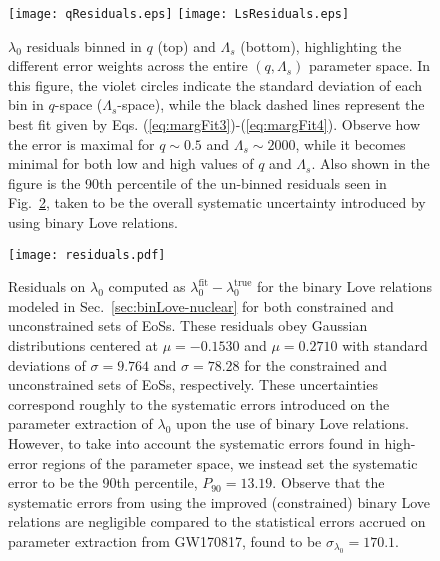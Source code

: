 \documentclass[prd,twocolumn,nofootinbib,superscriptaddress,amsmath,amssymb]{revtex4-1}
\begin{document}
\begin{figure}
\begin{center} 
\texttt{[image: qResiduals.eps]}
\texttt{[image: LsResiduals.eps]}
\end{center}
\caption{$\lambda_0$ residuals binned in $q$ (top) and $\Lambda_s$ (bottom), highlighting the different error weights across the entire $(q,\Lambda_s)$ parameter space.
In this figure, the violet circles indicate the standard deviation of each bin in $q$-space ($\Lambda_s$-space), while the black dashed lines represent the best fit given by Eqs. (\ref{eq:margFit3})-(\ref{eq:margFit4}).
Observe how the error is maximal for $q\sim0.5$ and $\Lambda_s\sim2000$, while it becomes minimal for both low and high values of $q$ and $\Lambda_s$.
Also shown in the figure is the 90th percentile of the un-binned residuals seen in Fig.~\ref{fig:residuals}, taken to be the overall systematic uncertainty introduced by using binary Love relations.
}
\label{fig:qLsResiduals}
\end{figure}

\begin{figure}
\begin{center} 
\texttt{[image: residuals.pdf]}
\end{center}
\caption{
Residuals on $\lambda_0$ computed as $\lambda_0^{\text{fit}}-\lambda_0^{\text{true}}$ for the binary Love relations modeled in Sec.~\ref{sec:binLove-nuclear} for both constrained and unconstrained sets of EoSs.
These residuals obey Gaussian distributions centered at $\mu=-0.1530$ and $\mu=0.2710$ with standard deviations of $\sigma=9.764$ and $\sigma=78.28$ for the constrained and unconstrained sets of EoSs, respectively.
These uncertainties correspond roughly to the systematic errors introduced on the parameter extraction of $\lambda_0$ upon the use of binary Love relations.
However, to take into account the systematic errors found in high-error regions of the parameter space, we instead set the systematic error to be the 90th percentile, $P_{90}=13.19$.
Observe that the systematic errors from using the improved (constrained) binary Love relations are negligible compared to the statistical errors accrued on parameter extraction from GW170817, found to be $\sigma_{\lambda_0}=170.1$.
}
\label{fig:residuals}
\end{figure}
\end{document}
